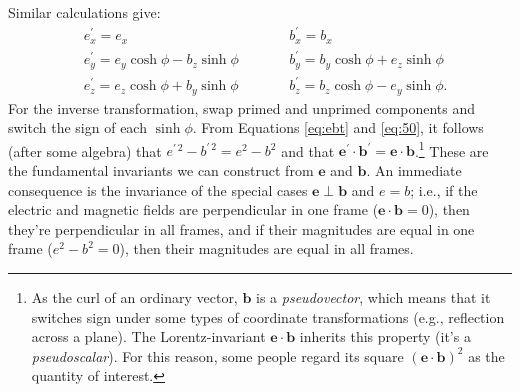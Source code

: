 \documentclass[12pt]{article}
\renewcommand{\vv}[1]{\mathbf{#1}}
\begin{document}
Similar calculations give:
\begin{equation}\label{eq:ebt}
\begin{aligned}
&e^\prime_x = e_x  \qquad \qquad& &b^\prime_x = b_x  \\
&e^\prime_y = e_y \cosh{\phi} - b_z \sinh{\phi}  \qquad& &b^\prime_y = b_y \cosh{\phi} + e_z \sinh{\phi} \\
&e^\prime_z = e_z \cosh{\phi} + b_y \sinh{\phi}  \qquad& &b^\prime_z = b_z \cosh{\phi} - e_y \sinh{\phi} .
\end{aligned}
\end{equation}
For the inverse transformation, swap primed and unprimed components and switch the sign of each $\sinh{\phi}$. From Equations \ref{eq:ebt} and \ref{eq:50}, it follows (after some algebra) that  ${e^{\prime \, 2} - b^{\prime \, 2} = e^2 - b^2}$ and that $\vv e^\prime \cdot \vv b^\prime = \vv e \cdot \vv b$.\footnote{\label{fn:ps}As the curl of an ordinary vector, $\vv b$ is a \emph{pseudovector}, which means that it switches sign under some types of coordinate transformations (e.g., reflection across a plane). The Lorentz-invariant $\vv e \cdot \vv b$ inherits this property (it's a \emph{pseudoscalar}). For this reason, some people regard its square $(\vv e \cdot \vv b)^2$ as the quantity of interest.} These are the fundamental invariants we can construct from $\vv e$ and $\vv b$. An immediate consequence is the invariance of the special cases $\vv e \perp \vv b$ and $e = b$; i.e., if the electric and magnetic fields are perpendicular in one frame ($\vv e \cdot \vv b = 0$), then they're perpendicular in all frames, and if their magnitudes are equal in one frame ($e^2 - b^2 = 0$), then their magnitudes are equal in all frames.
\end{document}
